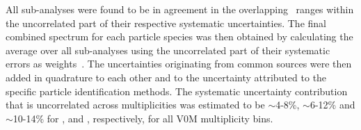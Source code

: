 

All sub-analyses were found to be in agreement in the overlapping \pt\ ranges within the uncorrelated part of their respective systematic uncertainties. The final combined spectrum for each particle species was then obtained by calculating the average over all sub-analyses using the uncorrelated part of their systematic errors as weights~\cite{Patrignani:2016xqp}. 
The uncertainties originating from common sources were then added in quadrature to each other and to the uncertainty attributed to the specific particle identification methods. The systematic uncertainty contribution that is uncorrelated across multiplicities was estimated to be $\sim$4-8\%, $\sim$6-12\% and $\sim$10-14\% for \pipm, \kapm and \p, respectively, for all V0M multiplicity bins. 


